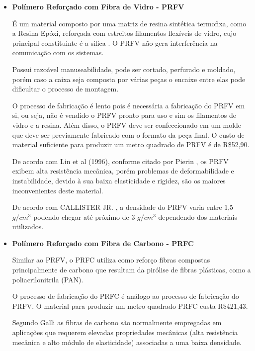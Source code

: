\begin{itemize}
    \item \textbf{Polímero Reforçado com Fibra de Vidro - PRFV}
    
    \par É um material composto por uma matriz de resina sintética termofixa, como a Resina Epóxi, reforçada com estreitos filamentos flexíveis de vidro, cujo principal constituinte é a sílica \cite{pierin2005estudo}. O PRFV não gera interferência na comunicação com os sistemas. 
    
    \par Possui razoável manuseabilidade, pode ser cortado, perfurado e moldado, porém caso a caixa seja composta por várias peças o encaixe entre elas pode dificultar o processo de montagem.    
    
    \par O processo de fabricação é lento pois é necessária a fabricação do PRFV em si, ou seja, não é vendido o PRFV pronto para uso e sim os filamentos de vidro e a resina. Além disso, o PRFV deve ser confeccionado em um molde que deve ser previamente fabricado com o formato da peça final. O custo de material suficiente para produzir um metro quadrado de PRFV é de R\$52,90.  
    
    \par De acordo com Lin et al (1996), conforme citado por Pierin \cite{pierin2005estudo}, os PRFV exibem alta resistência mecânica, porém problemas de deformabilidade e instabilidade, devido à sua baixa elasticidade e rigidez, são os maiores inconvenientes deste material. 
    
    \par De acordo com CALLISTER JR. \cite{callister2000ciencia}, a densidade do PRFV varia entre 1,5 $g/cm^3$ podendo chegar até próximo de 3 $g/cm^3$ dependendo dos materiais utilizados.
    
    \item \textbf{Polímero Reforçado com Fibra de Carbono - PRFC}
    \par Similar ao PRFV, o PRFC utiliza como reforço fibras compostas principalmente de carbono que resultam da pirólise de fibras plásticas, como a poliacrilonitrila (PAN). 
    
    \par O processo de fabricação do PRFC é análogo ao processo de fabricação do PRFV. O material para produzir um metro quadrado PRFC custa R\$421,43.
    
    \par Segundo Galli \cite{galli2016caracterizaccao} as fibras de carbono são normalmente empregadas em aplicações que requerem elevadas propriedades mecânicas (alta resistência mecânica e alto módulo de elasticidade) associadas a uma baixa densidade.
    

\end{itemize}
